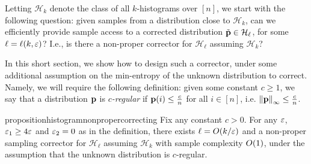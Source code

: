 Letting $\mathcal{H}_{k}$ denote the class of all $k$-histograms over $[n]$, we start with the following question: given samples from a distribution close to $\mathcal{H}_{k}$, can we efficiently provide sample access to a corrected distribution $\tilde{\mathbf{p}}\in \mathcal{H}_{\ell}$, for some $\ell=\ell(k,\varepsilon)$? I.e., is there a non-proper corrector for $\mathcal{H}_{\ell}$ assuming $\mathcal{H}_{k}$? 

In this short section, we show how to design such a corrector, under some additional assumption on {the min-entropy of} the unknown distribution to correct. Namely, we will require the following definition: given some constant $c\geq 1$, we say that a distribution $\mathbf{p}$ is \emph{$c$-regular} if $\mathbf{p}(i) \leq \frac{c}{n}$ for all $i\in[n]$, i.e. ${\lVert\mathbf{p}{\rVert}}_\infty \leq \frac{c}{n}$.
\begin{restatable}{proposition}{histogramnonpropercorrecting} \label{lemma:histogram:corrector:nonproper}
  Fix any constant $c>0$. For any $\varepsilon$, $\varepsilon_1 \geq 4\varepsilon$ and $\varepsilon_2=0$ as in the definition, there exists $\ell=O(k/\varepsilon)$ and a non-proper sampling corrector for $\mathcal{H}_{\ell}$ assuming $\mathcal{H}_{k}$ with sample complexity $\bigO{1}$, under the assumption that the unknown distribution is $c$-regular.
\end{restatable}
